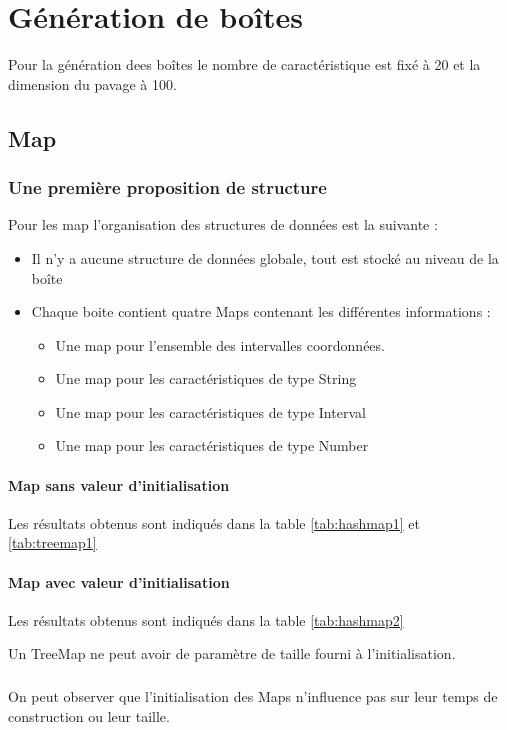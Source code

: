 \chapter{Génération de boîtes}
Pour la génération dees boîtes le nombre de caractéristique est fixé à 20 et la dimension du pavage à 100.

\section{Map}

\subsection{Une première proposition de structure}
Pour les map l'organisation des structures de données est la suivante :
\begin{itemize}
\item Il n'y a aucune structure de données globale, tout est stocké au niveau de la boîte
 \item Chaque boite contient quatre Maps contenant les différentes informations :
\begin{itemize}
 \item Une map pour l'ensemble des intervalles coordonnées.
\item Une map pour les caractéristiques de type String
\item Une map pour les caractéristiques de type Interval
\item Une map pour les caractéristiques de type Number
\end{itemize}
\end{itemize}

\subsubsection{Map sans valeur d'initialisation}
Les résultats obtenus sont indiqués dans la table \ref{tab:hashmap1} et \ref{tab:treemap1}


\subsubsection{Map avec valeur d'initialisation}
Les résultats obtenus sont indiqués dans la table \ref{tab:hashmap2}


Un TreeMap ne peut avoir de paramètre de taille fourni à l'initialisation.

\paragraph{} On peut observer que l'initialisation des Maps n'influence pas sur leur temps de construction ou leur taille.

